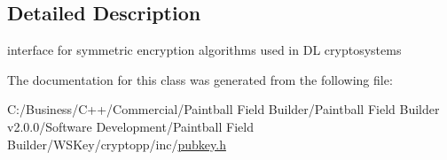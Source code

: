 \subsection{Detailed Description}
interface for symmetric encryption algorithms used in DL cryptosystems 

The documentation for this class was generated from the following file:\begin{DoxyCompactItemize}
\item 
C:/Business/C++/Commercial/Paintball Field Builder/Paintball Field Builder v2.0.0/Software Development/Paintball Field Builder/WSKey/cryptopp/inc/\hyperlink{pubkey_8h}{pubkey.h}\end{DoxyCompactItemize}

